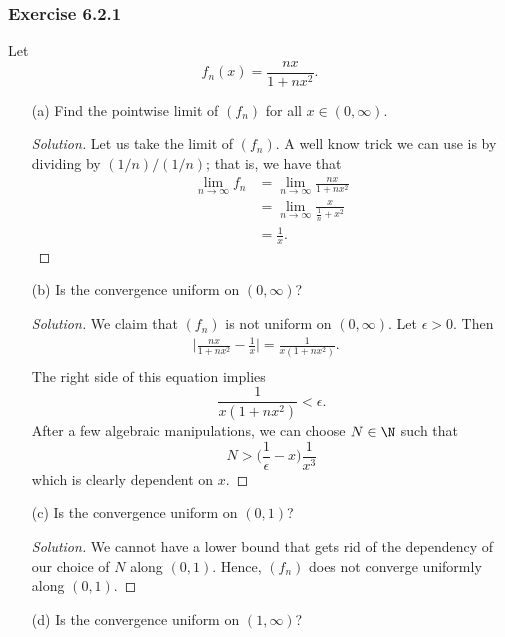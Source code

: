 \subsubsection{Exercise 6.2.1} Let 
\[  f_n(x) = \frac{ nx }{ 1 + nx^2  }. \]
\begin{enumerate}
    \item[(a)] Find the pointwise limit of \( (f_n)  \) for all \( x \in (0, \infty ) \).
        \begin{proof}[Solution]
        Let us take the limit of \( (f_n)  \). A well know trick we can use is by dividing by \( (1/n) / (1/n)  \); that is, we have that
        \begin{align*}
            \lim_{ n \to \infty  } f_n &= \lim_{ n \to \infty  } \frac{ nx  }{  1 + nx^2  }  \\
                                       &= \lim_{ n \to \infty  } \frac{ x  }{ \frac{ 1 }{ n } + x^2  } \\
                                       &= \frac{ 1 }{ x  }.
        \end{align*}
        \end{proof}
    \item[(b)] Is the convergence uniform on \( (0,\infty)  \)?
        \begin{proof}[Solution]
        We claim that \( (f_n)  \) is not uniform on \( (0, \infty ) \). Let \( \epsilon > 0  \). Then 
        \begin{align*}
            \Big| \frac{ nx }{ 1 + nx^2  } -  \frac{ 1 }{ x }  \Big| = \frac{ 1  }{ x(1+nx^2 ) }.  &\\
        \end{align*}
        The right side of this equation implies 
        \[  \frac{ 1 }{ x(1+nx^2)  } < \epsilon. \]
        After a few algebraic manipulations, we can choose \( N \in \N  \) such that 
        \[  N > \Big( \frac{ 1 }{ \epsilon  } - x  \Big) \frac{ 1 }{ x^3  }  \]
        which is clearly dependent on \( x  \). 
        \end{proof}
    \item[(c)] Is the convergence uniform on \( (0,1)  \)? 
        \begin{proof}[Solution]
            We cannot have a lower bound that gets rid of the dependency of our choice of \( N   \) along \( (0,1)  \). Hence, \( (f_n)  \) does not converge uniformly along \( (0,1)  \).
        \end{proof}
    \item[(d)] Is the convergence uniform on \( (1,\infty ) \)?

\end{enumerate}
